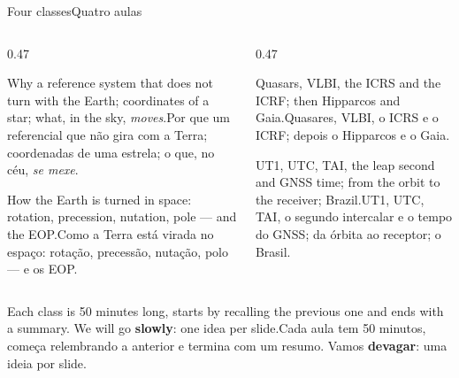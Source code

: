 \documentclass[aspectratio=169,11pt]{beamer}
\newcommand{\tr}[2]{\ifEN#2\else#1\fi}
\newcommand{\bnum}[1]{\textbf{\textcolor{mTeal}{#1}}}
\begin{document}
\begin{frame}{\tr{Quatro aulas}{Four classes}}
  \begin{columns}[T]
    \begin{column}{0.47\textwidth}
      \begin{regra}[title={\tr{Aula 1 · Um céu que não gira}{Class 1 · A sky that does not
        spin}}]
        \small\tr{Por que um referencial que não gira com a Terra; coordenadas de uma estrela; o
        que, no céu, \emph{se mexe}.}{Why a reference system that does not turn with the Earth;
        coordinates of a star; what, in the sky, \emph{moves}.}
      \end{regra}
      \vspace{2pt}
      \begin{regra}[title={\tr{Aula 3 · A ponte céu--chão}{Class 3 · The sky--ground
        bridge}}]
        \small\tr{Como a Terra está virada no espaço: rotação, precessão, nutação, polo --- e os
        EOP.}{How the Earth is turned in space: rotation, precession, nutation, pole --- and the
        EOP.}
      \end{regra}
    \end{column}
    \begin{column}{0.47\textwidth}
      \begin{regra}[title={\tr{Aula 2 · Os faróis do Universo}{Class 2 · The beacons of the
        Universe}}]
        \small\tr{Quasares, VLBI, o ICRS e o ICRF; depois o Hipparcos e o Gaia.}{Quasars, VLBI,
        the ICRS and the ICRF; then Hipparcos and Gaia.}
      \end{regra}
      \vspace{2pt}
      \begin{regra}[title={\tr{Aula 4 · O tempo e a prática}{Class 4 · Time and practice}}]
        \small\tr{UT1, UTC, TAI, o segundo intercalar e o tempo do GNSS; da órbita ao receptor; o
        Brasil.}{UT1, UTC, TAI, the leap second and GNSS time; from the orbit to the receiver;
        Brazil.}
      \end{regra}
    \end{column}
  \end{columns}
  \vspace{2pt}
  \centering\footnotesize
  \tr{Cada aula tem 50 minutos, começa relembrando a anterior e termina com um resumo.
  Vamos \bnum{devagar}: uma ideia por slide.}{Each class is 50 minutes long, starts by
  recalling the previous one and ends with a summary. We will go \bnum{slowly}: one idea per
  slide.}
\end{frame}
\end{document}
